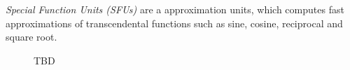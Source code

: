

\textit{Special Function Units (SFUs)} are a approximation units, which computes fast approximations of transcendental functions such as sine, cosine, reciprocal and square root.

\begin{figure}[H]
	\centering
	\caption{TBD}
	\label{fig:hw-sm}
\end{figure}
